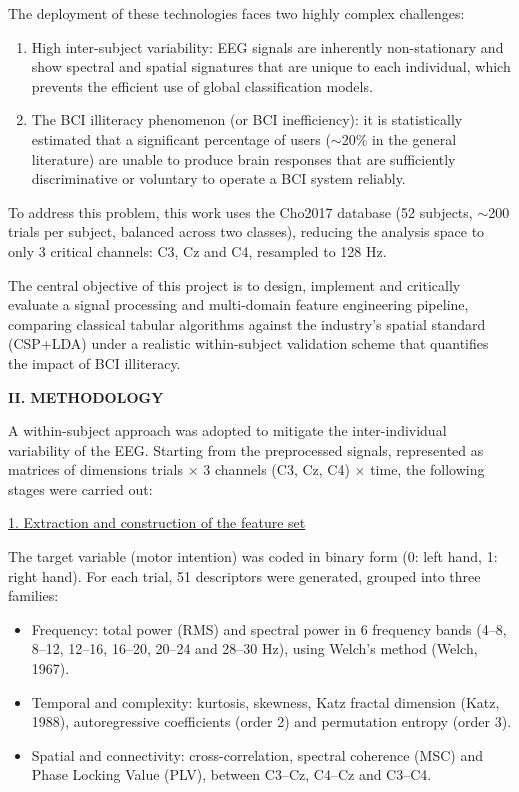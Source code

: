 \documentclass[12pt,a4paper]{article}
\newcommand{\mainsection}[1]{%
  \par\bigskip\noindent\textbf{#1}\par\nopagebreak}
\newcommand{\subheading}[1]{%
  \par\noindent\underline{#1}\par\nopagebreak}
\begin{document}
The deployment of these technologies faces two highly complex challenges:
\begin{enumerate}
  \item High inter-subject variability: EEG signals are inherently non-stationary and show
        spectral and spatial signatures that are unique to each individual, which prevents the
        efficient use of global classification models.
  \item The BCI illiteracy phenomenon (or BCI inefficiency): it is statistically estimated that a
        significant percentage of users ($\sim$20\% in the general literature) are unable to
        produce brain responses that are sufficiently discriminative or voluntary to operate a
        BCI system reliably.
\end{enumerate}

To address this problem, this work uses the Cho2017 database (52 subjects, $\sim$200 trials per
subject, balanced across two classes), reducing the analysis space to only 3 critical channels:
C3, Cz and C4, resampled to 128 Hz.

The central objective of this project is to design, implement and critically evaluate a signal
processing and multi-domain feature engineering pipeline, comparing classical tabular algorithms
against the industry's spatial standard (CSP+LDA) under a realistic within-subject validation
scheme that quantifies the impact of BCI illiteracy.

\mainsection{II. METHODOLOGY}
A within-subject approach was adopted to mitigate the inter-individual variability of the EEG.
Starting from the preprocessed signals, represented as matrices of dimensions
trials $\times$ 3 channels (C3, Cz, C4) $\times$ time, the following stages were carried out:

\subheading{1. Extraction and construction of the feature set}
The target variable (motor intention) was coded in binary form (0: left hand, 1: right hand).
For each trial, 51 descriptors were generated, grouped into three families:
\begin{itemize}[label=-, leftmargin=3.4cm]
  \item Frequency: total power (RMS) and spectral power in 6 frequency bands (4--8, 8--12,
        12--16, 16--20, 20--24 and 28--30 Hz), using Welch's method (Welch, 1967).
  \item Temporal and complexity: kurtosis, skewness, Katz fractal dimension (Katz, 1988),
        autoregressive coefficients (order 2) and permutation entropy (order 3).
  \item Spatial and connectivity: cross-correlation, spectral coherence (MSC) and Phase Locking
        Value (PLV), between C3--Cz, C4--Cz and C3--C4.
\end{itemize}
\end{document}
